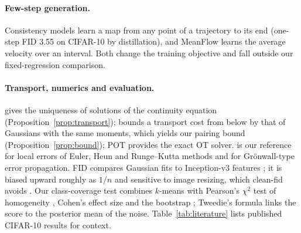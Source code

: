 \paragraph{Few-step generation.} Consistency models \citep{song2023cm} learn a map from any point of a trajectory to its end (one-step FID 3.55 on CIFAR-10 by distillation), and MeanFlow \citep{geng2025meanflow} learns the average velocity over an interval. Both change the training objective and fall outside our fixed-regression comparison.

\paragraph{Transport, numerics and evaluation.} \citet{villani2009ot} gives the uniqueness of solutions of the continuity equation (Proposition~\ref{prop:transport}); \citet{gelbrich1990} bounds a transport cost from below by that of Gaussians with the same moments, which yields our pairing bound (Proposition~\ref{prop:bound}); POT \citep{flamary2021pot} provides the exact OT solver. \citet{hairer1993ode} is our reference for local errors of Euler, Heun and Runge--Kutta methods and for Gr\"onwall-type error propagation. FID \citep{heusel2017fid} compares Gaussian fits to Inception-v3 features \citep{szegedy2016inception}; it is biased upward roughly as $1/n$ \citep{chong2020fid} and sensitive to image resizing, which clean-fid avoids \citep{parmar2022cleanfid}. Our class-coverage test combines $k$-means \citep{lloyd1982kmeans} with Pearson's $\chi^2$ test of homogeneity \citep{agresti2013cda}, Cohen's effect size \citep{cohen1988power} and the bootstrap \citep{efron1979bootstrap}; Tweedie's formula \citep{efron2011tweedie} links the score to the posterior mean of the noise. Table~\ref{tab:literature} lists published CIFAR-10 results for context.


